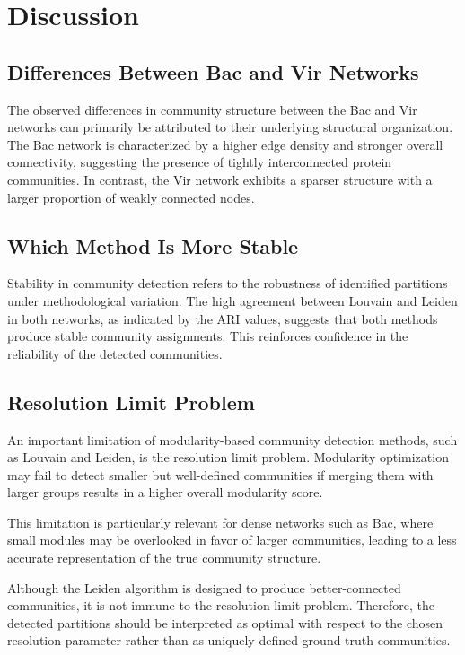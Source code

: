 \section{Discussion}

\subsection{Differences Between Bac and Vir Networks}

The observed differences in community structure between the Bac and Vir networks
can primarily be attributed to their underlying structural organization.
The Bac network is characterized by a higher edge density and stronger overall connectivity,
suggesting the presence of tightly interconnected protein communities.
In contrast, the Vir network exhibits a sparser structure with a larger 
proportion of weakly connected nodes.

\subsection{Which Method Is More Stable}

Stability in community detection refers to the robustness 
of identified partitions under methodological variation.
The high agreement between Louvain and Leiden in both networks, as indicated by the ARI values,
suggests that both methods produce stable community assignments.
This reinforces confidence in the reliability of the detected communities.

\subsection{Resolution Limit Problem}

An important limitation of modularity-based community detection methods, such as Louvain and Leiden,
is the resolution limit problem. Modularity optimization may fail to 
detect smaller but well-defined communities if merging them with larger groups
results in a higher overall modularity score.

This limitation is particularly relevant for dense networks such as Bac, where small modules
may be overlooked in favor of larger communities, leading to a
less accurate representation of the true community structure.

Although the Leiden algorithm is designed to produce better-connected communities, 
it is not immune to the resolution limit problem.
Therefore, the detected partitions should be interpreted as optimal with respect to the 
chosen resolution parameter rather than as uniquely defined ground-truth communities.